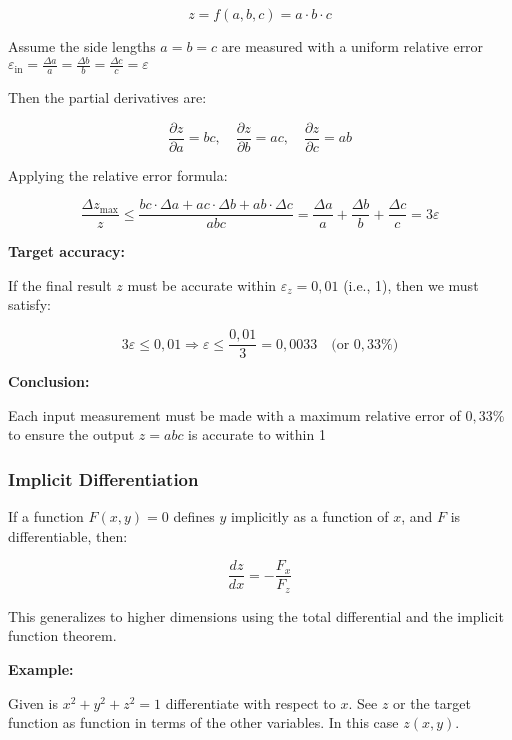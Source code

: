 \[
    z = f(a, b, c) = a \cdot b \cdot c
\]

Assume the side lengths \( a = b = c \) are measured with a uniform relative error \( \varepsilon_{\text{in}} = \frac{\Delta a}{a} = \frac{\Delta b}{b} = \frac{\Delta c}{c} = \varepsilon \)

Then the partial derivatives are:

\[
    \frac{\partial z}{\partial a} = b c, \quad
    \frac{\partial z}{\partial b} = a c, \quad
    \frac{\partial z}{\partial c} = a b
\]

Applying the relative error formula:

\[
    \frac{\Delta z_{\max}}{z} \leq \frac{bc \cdot \Delta a + ac \cdot \Delta b + ab \cdot \Delta c}{abc}
    = \frac{\Delta a}{a} + \frac{\Delta b}{b} + \frac{\Delta c}{c} = 3 \varepsilon
\]

\textbf{Target accuracy:}  

If the final result \( z \) must be accurate within \( \varepsilon_z = 0{,}01 \) (i.e., 1), then we must satisfy:

\[
    3 \varepsilon \leq 0{,}01 \Rightarrow \varepsilon \leq \frac{0{,}01}{3} = \boxed{0{,}0033} \quad \text{(or } 0{,}33\% \text{)}
\]

\textbf{Conclusion:}
\vspace{\baselineskip}

Each input measurement must be made with a maximum relative error of \( \boxed{0{,}33\%} \) to ensure the output \( z = abc \) is accurate to within 1%

\subsubsection{Implicit Differentiation}

If a function \( F(x, y) = 0 \) defines \( y \) implicitly as a function of \( x \), and \( F \) is differentiable, then:

\[
    \frac{dz}{dx} = -\frac{F_x}{F_z}
\]

This generalizes to higher dimensions using the total differential and the implicit function theorem.
\vspace{\baselineskip}

\textbf{Example:}
\vspace{\baselineskip}

Given is \(x^2 + y^2 + z^2 = 1\) differentiate with respect to \(x\).
See \(z\) or the target function as function in terms of the other variables. 
In this case \(z(x,y)\).

